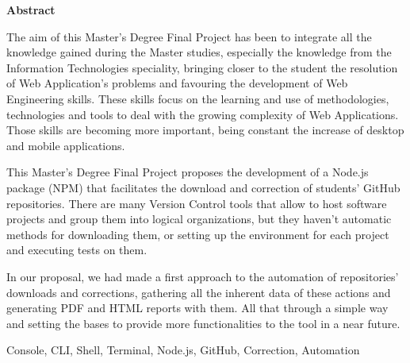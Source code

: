 \documentclass[spanish,a4paper,14pt,oneside]{extreport}
\newenvironment{summary}
{\par\noindent\begin{center}\textbf{Abstract}\end{center}\begin{itshape}\par\noindent}
{\end{itshape}}
\newenvironment{keywords}
{\begin{list}{}{\setlength{\leftmargin}{1em}}\item[\hskip\labelsep \bfseries Keywords:]}
{\end{list}}
\begin{document}
\newpage  %
\begin{summary}
{\em

The aim of this Master's Degree Final Project has been to integrate all the knowledge gained during the Master studies, especially the knowledge from the Information Technologies speciality, bringing closer to the student the resolution of Web Application's problems and favouring the development of Web Engineering skills. These skills focus on the learning and use of methodologies, technologies and tools to deal with the growing complexity of Web Applications. Those skills are becoming more important, being constant the increase of desktop and mobile applications.
\bigskip

This Master's Degree Final Project proposes the development of a Node.js package (NPM) that facilitates the download and correction of students' GitHub repositories.
There are many Version Control tools that allow to host software projects and group them into logical organizations, but  they haven't automatic methods for downloading them, or setting up the environment for each project and executing tests on them.
\bigskip

In our proposal, we had made a first approach to the automation of repositories' downloads and corrections, gathering all the inherent data of these actions and generating PDF and HTML reports with them. All that through a simple way and setting the bases to provide more functionalities to the tool in a near future.  
}

\begin{keywords}
Console, CLI, Shell, Terminal, Node.js, GitHub, Correction, Automation
\end{keywords}

\end{summary}

\newpage{\pagestyle{empty}}
\thispagestyle{empty}



\pagestyle{myheadings} %
\end{document}
